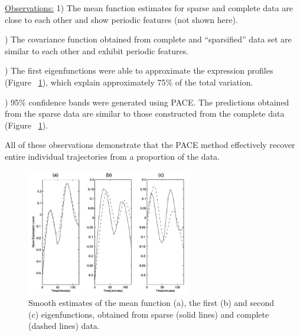 \documentclass[11pt]{report}
\begin{document}
\noindent \underline{Observations:} 1) The mean function estimates for sparse and complete data are close to each other and show periodic features (not shown here).

) The covariance function obtained from complete and ``sparsified'' data set are similar to each other and exhibit periodic features. %

) The first eigenfunctions were able to approximate the expression profiles (Figure ~\ref{fig:fig8}), which explain approximately 75\% of the total variation.

) 95\% confidence bands were generated using PACE. 
The predictions obtained from the sparse data are similar to those constructed from the complete data (Figure ~\ref{fig:fig8}).

All of these observations demonstrate that the PACE method effectively recover entire individual trajectories from a proportion of the data. 

\begin{figure} 
	\centering
		\vspace{-1 cm}
	    \includegraphics[width=0.64\textwidth]{Figures/Figure8.png}
	   	\vspace{-0.5 cm}
	   	\caption{Smooth estimates of the mean function (a), the first (b) and second (c) eigenfunctions, obtained from sparse (solid lines) and complete (dashed lines) data.}
	   	\vspace{-0.5 cm}
		\label{fig:fig8}
\end{figure}
\end{document}
